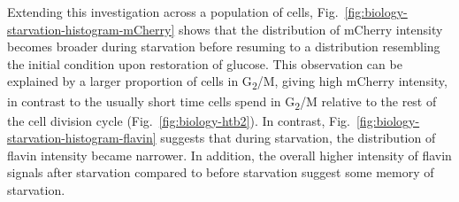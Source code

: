Extending this investigation across a population of cells, Fig.\ \ref{fig:biology-starvation-histogram-mCherry} shows that the distribution of mCherry intensity becomes broader during starvation before resuming to a distribution resembling the initial condition upon restoration of glucose.
This observation can be explained by a larger proportion of cells in G\textsubscript{2}/M, giving high mCherry intensity, in contrast to the usually short time cells spend in G\textsubscript{2}/M relative to the rest of the cell division cycle (Fig.\ \ref{fig:biology-htb2}).
In contrast, Fig.\ \ref{fig:biology-starvation-histogram-flavin} suggests that during starvation, the distribution of flavin intensity became narrower.
In addition, the overall higher intensity of flavin signals after starvation compared to before starvation suggest some memory of starvation.

